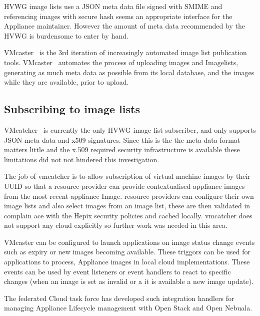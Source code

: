 \documentclass{llncs_Ibergrid2013}
\begin{document}
HVWG image lists use a JSON meta data file signed with SMIME and referencing images with secure hash seems an appropriate interface for the Appliance maintainer. However the amount of meta data recommended by the HVWG is burdensome to enter by hand.
 
VMcaster~\cite{vmcaster} is the 3rd iteration of increasingly automated image list publication tools. VMcaster~\cite{vmcaster} automates the process of uploading images and Imagelists, generating as much meta data as possible from its local database, and the images while they are available, prior to upload.

\subsection{Subscribing to image lists}

VMcatcher~\cite{vmcatcher} is currently the only HVWG image list subscriber, and only supports JSON meta data and x509 signatures. Since this is the the meta data format matters little and the x.509 required security infrastructure is available these limitations did not not hindered this investigation.

The job of vmcatcher is to allow subscription of virtual machine images by their UUID so that a resource provider can provide contextualised appliance images from the most recent appliance Image. resource providers can configure their own image lists and also select images from an image list, these are then validated in complain ace with the Hepix security policies and cached locally. vmcatcher does not support any cloud explicitly so further work was needed in this area.

VMcaster can be configured to launch applications on image status change events such as expiry or new images becoming available. These triggors can be used for applications to process, Appliance images in local cloud implementations.  These events can be used by event listeners or event handlers to react to specific changes (when an image is set as invalid or a it is available a new image update). 

The federated Cloud task force has developed such integration handlers for managing Appliance Lifecycle management with Open Stack and Open Nebuala.
\end{document}
